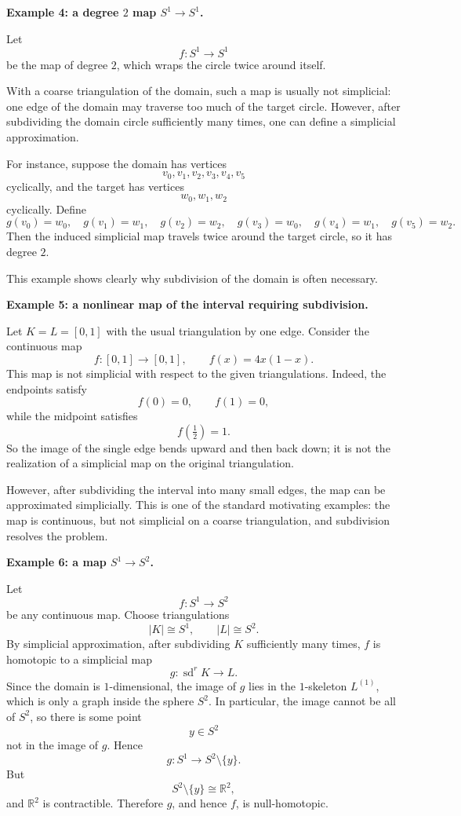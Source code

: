 \documentclass[12pt,a4paper]{article}
\theoremstyle{notespace}
\begin{document}
\medskip

\textbf{Example 4: a degree \(2\) map \(S^1\to S^1\).}

Let
\[
f:S^1\to S^1
\]
be the map of degree \(2\), which wraps the circle twice around itself.

With a coarse triangulation of the domain, such a map is usually not simplicial: one edge of the domain may traverse too much of the target circle. However, after subdividing the domain circle sufficiently many times, one can define a simplicial approximation.

For instance, suppose the domain has vertices
\[
v_0,v_1,v_2,v_3,v_4,v_5
\]
cyclically, and the target has vertices
\[
w_0,w_1,w_2
\]
cyclically. Define
\[
g(v_0)=w_0,\quad g(v_1)=w_1,\quad g(v_2)=w_2,\quad
g(v_3)=w_0,\quad g(v_4)=w_1,\quad g(v_5)=w_2.
\]
Then the induced simplicial map travels twice around the target circle, so it has degree \(2\).

This example shows clearly why subdivision of the domain is often necessary.

\medskip

\textbf{Example 5: a nonlinear map of the interval requiring subdivision.}

Let \(K=L=[0,1]\) with the usual triangulation by one edge. Consider the continuous map
\[
f:[0,1]\to [0,1],\qquad f(x)=4x(1-x).
\]
This map is not simplicial with respect to the given triangulations. Indeed, the endpoints satisfy
\[
f(0)=0,\qquad f(1)=0,
\]
while the midpoint satisfies
\[
f\!\left(\tfrac12\right)=1.
\]
So the image of the single edge bends upward and then back down; it is not the realization of a simplicial map on the original triangulation.

However, after subdividing the interval into many small edges, the map can be approximated simplicially. This is one of the standard motivating examples: the map is continuous, but not simplicial on a coarse triangulation, and subdivision resolves the problem.

\medskip

\textbf{Example 6: a map \(S^1\to S^2\).}

Let
\[
f:S^1\to S^2
\]
be any continuous map. Choose triangulations
\[
|K|\cong S^1,
\qquad
|L|\cong S^2.
\]
By simplicial approximation, after subdividing \(K\) sufficiently many times, \(f\) is homotopic to a simplicial map
\[
g:\operatorname{sd}^r K \to L.
\]
Since the domain is \(1\)-dimensional, the image of \(g\) lies in the \(1\)-skeleton \(L^{(1)}\), which is only a graph inside the sphere \(S^2\). In particular, the image cannot be all of \(S^2\), so there is some point
\[
y\in S^2
\]
not in the image of \(g\). Hence
\[
g:S^1\to S^2\setminus\{y\}.
\]
But
\[
S^2\setminus\{y\}\cong \mathbb R^2,
\]
and \(\mathbb R^2\) is contractible. Therefore \(g\), and hence \(f\), is null-homotopic.
\end{document}
